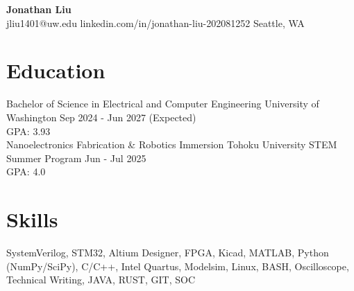 \documentclass[11pt,letterpaper]{article}
\begin{document}
\begin{center}
{\LARGE \textbf{Jonathan Liu}}\\[2pt]
\small jliu1401@uw.edu \textbullet{} linkedin.com/in/jonathan-liu-202081252 \textbullet{} Seattle, WA
\end{center}
\section*{Education}
\noindent Bachelor of Science in Electrical and Computer Engineering \textbar{} University of Washington \textbar{} Sep 2024 - Jun 2027 (Expected)\\
GPA: 3.93\\
\noindent Nanoelectronics Fabrication \& Robotics Immersion \textbar{} Tohoku University STEM Summer Program \textbar{} Jun - Jul 2025\\
GPA: 4.0\\
\section*{Skills}
SystemVerilog, STM32, Altium Designer, FPGA, Kicad, MATLAB, Python (NumPy/SciPy), C/C++, Intel Quartus, Modelsim, Linux, BASH, Oscilloscope, Technical Writing, JAVA, RUST, GIT, SOC
\end{document}
